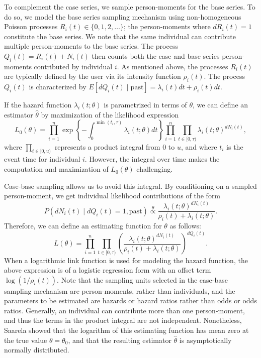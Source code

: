 To complement the case series, we sample person-moments for the base
series. To do so, we model the base series sampling mechanism using
non-homogeneous Poisson processes \(R_i(t) \in \{0, 1, 2, \ldots\}\);
the person-moments where \(dR_i(t) = 1\) constitute the base series. We
note that the same individual can contribute multiple person-moments to
the base series. The process \(Q_{i}(t) = R_i(t) + N_{i}(t)\) then
counts both the case and base series person-moments contributed by
individual \(i\). As mentioned above, the processes \(R_i(t)\) are
typically defined by the user via its intensity function \(\rho_i(t)\).
The process \(Q_{i}(t)\) is characterized by
\(E[dQ_{i}(t)\mid\mathrm{past}] = \lambda_{i}(t)dt + \rho_i(t)dt\).

If the hazard function \(\lambda_{i}(t; \theta)\) is parametrized in
terms of \(\theta\), we can define an estimator \(\hat{\theta}\) by
maximization of the likelihood expression
\[L_0(\theta) = \prod_{i=1}^n \exp\left\{ -\int_0^{\min(t_i,\tau)} \lambda_i(t; \theta) dt \right\} \prod_{i=1}^{n} \prod_{t\in[0,\tau)} \lambda_{i}(t;\theta)^{dN_{i}(t)},\]
where \(\prod_{t\in[0,u)}\) represents a product integral from \(0\) to
\(u\), and where \(t_i\) is the event time for individual \(i\).
However, the integral over time makes the computation and maximization
of \(L_0(\theta)\) challenging.

Case-base sampling allows us to avoid this integral. By conditioning on
a sampled person-moment, we get individual likelihood contributions of
the form
\[P(dN_{i}(t) \mid dQ_{i}(t) = 1,\mathrm{past}) \stackrel{\theta}{\propto} \frac{\lambda_{i}(t; \theta)^{dN_{i}(t)}}{\rho_i(t) + \lambda_{i}(t;\theta)}.\]
Therefore, we can define an estimating function for \(\theta\) as
follows: \begin{equation}
L(\theta) = \prod_{i=1}^{n} \prod_{t\in[0,\tau)} \left(\frac{\lambda_{i}(t; \theta)^{dN_{i}(t)}}{\rho_i(t) + \lambda_{i}(t;\theta)}\right)^{dQ_i(t)}. \label{eq:lik-function}
\end{equation} When a logarithmic link function is used for modeling the
hazard function, the above expression is of a logistic regression form
with an offset term \(\log(1/\rho_i(t))\). Note that the sampling units
selected in the case-base sampling mechanism are person-moments, rather
than individuals, and the parameters to be estimated are hazards or
hazard ratios rather than odds or odds ratios. Generally, an individual
can contribute more than one person-moment, and thus the terms in the
product integral are not independent. Nonetheless, Saarela
\citeyearpar{saarela2016case} showed that the logarithm of this
estimating function has mean zero at the true value \(\theta=\theta_0\),
and that the resulting estimator \(\hat{\theta}\) is asymptotically
normally distributed.

